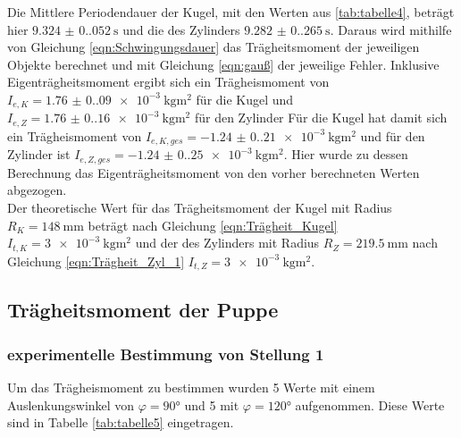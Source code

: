   Die Mittlere Periodendauer der Kugel, mit den Werten aus \ref{tab:tabelle4}, beträgt hier $\qty{9.324(0.052)}{\second}$ und die des Zylinders $\qty{9.282(0.265)}{\second}$.
  Daraus wird mithilfe von Gleichung \ref{eqn:Schwingungsdauer} das Trägheitsmoment der jeweiligen Objekte berechnet und mit Gleichung \ref{eqn:gauß} der jeweilige Fehler.
  Inklusive Eigenträgheitsmoment ergibt sich ein Trägheismoment von $I_{e,K}=\qty{1.76(0.09)e-3}{\kilo\gram\meter\squared}$ für die Kugel und
  $I_{e,Z}=\qty{1.76(0.16)e-3}{\kilo\gram\meter\squared}$ für den Zylinder
  Für die Kugel hat damit sich ein Trägheismoment von $I_{e,K,ges}=\qty{-1.24(0.21)e-3}{\kilo\gram\meter\squared}$ und für den
  Zylinder ist $I_{e,Z,ges}=\qty{-1.24(0.25)e-3}{\kilo\gram\meter\squared}$. Hier wurde zu dessen Berechnung das Eigenträgheitsmoment
  von den vorher berechneten Werten abgezogen.\\
  Der theoretische Wert für das Trägheitsmoment der Kugel mit Radius $R_K=\qty{148}{\milli\meter}$ beträgt nach Gleichung \ref{eqn:Trägheit_Kugel} $I_{t,K}=\qty{3e-3}{\kilo\gram\meter\squared}$
  und der des Zylinders mit Radius $R_Z=\qty{219.5}{\milli\meter}$ nach Gleichung \ref{eqn:Trägheit_Zyl_1} $I_{t,Z}=\qty{3e-3}{\kilo\gram\meter\squared}$.
  
  \subsection{Trägheitsmoment der Puppe}
    \subsubsection{experimentelle Bestimmung von Stellung 1}
    Um das Trägheismoment zu bestimmen wurden 5 Werte mit einem Auslenkungswinkel von $\varphi=90°$ und 5 mit $\varphi=120°$ aufgenommen.
    Diese Werte sind in Tabelle \ref{tab:tabelle5} eingetragen.

